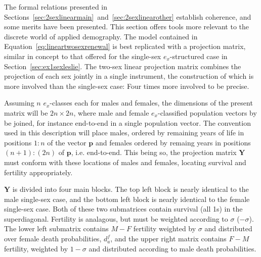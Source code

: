
The formal relations presented in
Sections~\ref{sec:2sexlinearmain}~and~\ref{sec:2sexlinearother} establish
coherence, and some merits have been presented. This section offers tools
more relevant to the discrete world of applied demography. The model contained
in Equation~\ref{eq:lineartwosexrenewal} is best replicated with a projection
matrix, similar in concept to that offered for the single-sex $e_x$-structured
case in Section~\ref{sec:ex1sexleslie}. The two-sex linear projection matrix combines
the projection of each sex jointly in a single instrument, the construction of 
which is more involved than the single-sex case: Four times more involved to be precise. 

Assuming $n$ $e_x$-classes each for males and females, the dimensions of the
present matrix will be $2n \times 2n$, where male and female
$e_x$-classified population vectors by be joined, for instance end-to-end in a
single population vector. The convention used in this description will place
males, ordered by remaining years of life in positions $1:n$ of the vector
$\textbf{p}$ and females ordered by remaing years in positions $(n+1):(2n)$ of
$\textbf{p}$, i.e. end-to-end. This being so, the projection matrix $\textbf{Y}$
must conform with these locations of males and females, locating survival and 
fertility appropriately.

$\textbf{Y}$ is divided into four main blocks. The top left block is
nearly identical to the male single-sex case, and the bottom left block is
nearly identical to the female single-sex case. Both of these two submatrices
contain survival (all 1s) in the superdiagonal. Fertility is analagous, but must
be weighted according to $\sigma$ ($-\sigma$). The lower left submatrix
contains $M-F$ fertility weighted by $\sigma$ and distributed over female death probabilities,
$d_a^f$, and the upper right matrix contains $F-M$ fertility, weighted by
$1-\sigma$ and distributed according to male death probabilities.

